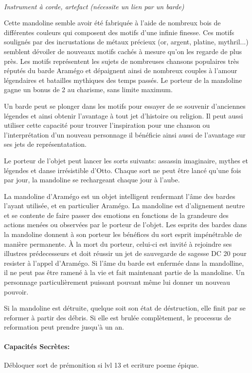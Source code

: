 \\
{\small \it Instrument à corde, artefact (nécessite un lien par
un barde)}\\
\label{MandolineAramego}

Cette mandoline semble avoir été fabriquée à l'aide de nombreux bois de 
différentes couleurs qui composent des motifs d'une infinie finesse. Ces
motifs soulignés par des incrustations de métaux précieux (or, argent,
platine, mythril...) semblent dévoiler de nouveaux motifs cachés à mesure
qu'on les regarde de plus près. Les motifs représentent les sujets
de nombreuses chansons populaires très réputés du barde Aramégo et 
dépaignent ainsi de nombreux couples à l'amour légendaires et batailles
mythiques des temps passés. Le porteur de la mandoline gagne un bonus de
2 au charisme, sans limite maximum. 

Un barde peut se plonger dans les motifs pour essayer de se souvenir 
d'anciennes légendes et ainsi obtenir l'avantage à tout jet d'histoire
ou religion. Il peut aussi utiliser cette capacité pour trouver 
l'inspiration pour une chanson ou l'interprétation d'un nouveau
personnage il bénéficie ainsi aussi de l'avantage sur ses jets de 
représentatation.

Le porteur de l'objet peut lancer les sorts suivants: assassin 
imaginaire, mythes et légendes et danse irrésistible d'Otto. Chaque
sort ne peut être lancé qu'une fois par jour, la mandoline se rechargeant 
chaque jour à l'aube.

La mandoline d'Aramégo est un objet intelligent renfermant l'âme des
bardes l'ayant utilisée, et en particulier Aramégo. La 
mandoline est d'alignement neutre et se contente de faire 
passer des emotions en fonctions de la grandeure des actions menées
ou observées par le porteur de l'objet. Les esprits des bardes dans la mandoline
donnent à son porteur les bénéfices du sort esprit impénétrable de 
manière permanente. À la mort du porteur, celui-ci 
est invité à rejoindre ses illustres prédecesseurs et doit réussir un 
jet de sauvegarde de sagesse DC 20 pour resister à l'appel d'Aramégo.
Si l'âme du barde est enfermée dans la mandolline, il ne peut pas être
ramené à la vie et fait maintenant partie de la mandoline. Un personnage 
particulièrement puissant pouvant même lui donner un nouveau pouvoir.

Si la mandoline est détruite, quelque soit son état de déstruction, elle 
finit par se reformer à partir des débris. Si elle est brulée complètement, 
le processus de reformation peut prendre jusqu'à un an.

\paragraph{Capacités Secrètes:}

Débloquer sort de prémonition si lvl 13 et ecriture poeme épique. \\

